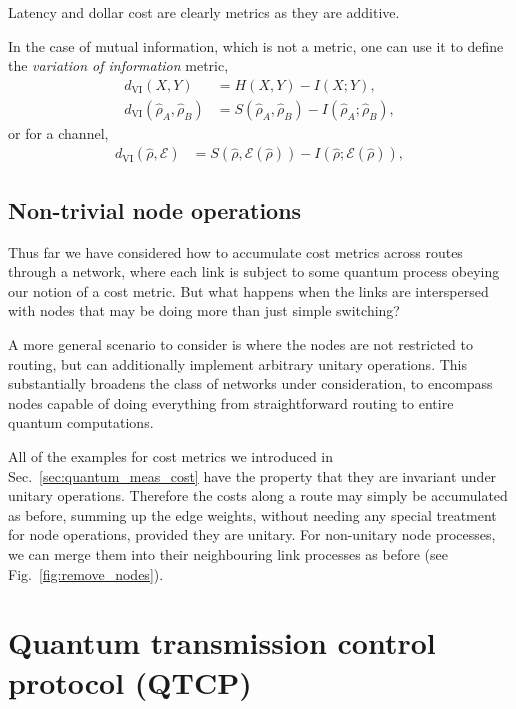 \documentclass[aps,rmp,twocolumn,amsmath,amssymb,nofootinbib,superscriptaddress,longbibliography,floatfix]{revtex4-1}
\begin{document}
Latency and dollar cost are clearly metrics as they are additive.

In the case of mutual information, which is not a metric, one can use it to define the \emph{variation of information} metric,
\begin{align}
d_\mathrm{VI}(X,Y) &= H(X,Y) - I(X;Y), \nonumber \\
d_\mathrm{VI}(\hat\rho_A,\hat\rho_B) &= S(\hat\rho_A,\hat\rho_B) - I(\hat\rho_A;\hat\rho_B),
\end{align}
or for a channel,
\begin{align}
d_\mathrm{VI}(\hat\rho,\mathcal{E}) &= S(\hat\rho,\mathcal{E}(\hat\rho)) - I(\hat\rho;\mathcal{E}(\hat\rho)),
\end{align}

%
%

\subsection{Non-trivial node operations}

Thus far we have considered how to accumulate cost metrics across routes through a network, where each link is subject to some quantum process obeying our notion of a cost metric. But what happens when the links are interspersed with nodes that may be doing more than just simple switching?

A more general scenario to consider is where the nodes are not restricted to routing, but can additionally implement arbitrary unitary operations. This substantially broadens the class of networks under consideration, to encompass nodes capable of doing everything from straightforward routing to entire quantum computations.

All of the examples for cost metrics we introduced in Sec.~\ref{sec:quantum_meas_cost} have the property that they are invariant under unitary operations. Therefore the costs along a route may simply be accumulated as before, summing up the edge weights, without needing any special treatment for node operations, provided they are unitary. For non-unitary node processes, we can merge them into their neighbouring link processes as before (see Fig.~\ref{fig:remove_nodes}).

%
%

\section{Quantum transmission control protocol (QTCP)}
\end{document}
